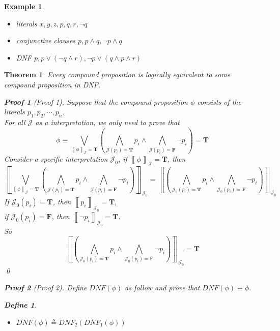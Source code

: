 \documentclass{ctexart}
\newcommand{\。}{．} %
\newcommand{\lb}{\left\llbracket}
\newcommand{\rb}{\right\rrbracket}
\newenvironment{huangse}{
    \begin{tcolorbox}[enhanced, breakable, colback=qhuang, boxrule=0pt, frame hidden,
        borderline west={0.7mm}{0.1mm}{shuang}]
    }
    {\end{tcolorbox}}
\newenvironment{zise}{
    \begin{tcolorbox}[enhanced, breakable, colback=qzi, boxrule=0pt, frame hidden,
        borderline west={0.7mm}{0.1mm}{szi}]
    }
    {\end{tcolorbox}}
\theoremstyle{t} %
\newtheorem{dyhj}{\color{slv} Define}[subsection] %
\newtheorem{dlhj}{\color{shuang} Theorem}[subsection]
\newtheorem{lthj}{\color{szi} Example}[subsection]
\newtheorem*{zmhj}{\color{slan} Proof}
\newenvironment{dl}{\begin{huangse}\begin{dlhj}}{\end{dlhj}\end{huangse}}
\newenvironment{lt}{\begin{zise}\begin{lthj}}{\end{lthj}\end{zise}}
\begin{document}
\begin{lt} \quad
    \begin{itemize}
        \item literals $x, y, z, p, q, r, \lnot q$
        \item conjunctive clauses $p, p \land q, \lnot p \land q$
        \item DNF $p, p \lor (\lnot q \land r), \lnot p \lor (q \land p \land r)$
    \end{itemize}
\end{lt}

\begin{dl}
    Every compound proposition is logically equivalent to some compound proposition in DNF.
    \begin{zmhj}[Proof 1]
        Suppose that the compound proposition $\phi$ consists of the literals $p_1, p_2, \cdots, p_n$. \\
        For all $\mathcal{J}$ as a interpretation, we only need to prove that 
        \[
            \phi \equiv \bigvee_{\lb \phi \rb_\mathcal{J} = \mathbf{T}}\left(\bigwedge_{\mathcal{J}(p_i) = \mathbf{T}}p_i \land \bigwedge_{\mathcal{J}(p_i) = \mathbf{F}}\lnot p_i \right) = \mathbf{T}
        \]
        Consider a specific interpretation $\mathcal{J}_0$, if $\lb \phi\rb_\mathcal{J} = \mathbf{T}$, then
        \[
            \left\llbracket \bigvee_{\lb \phi \rb_\mathcal{J} = \mathbf{T}}\left(\bigwedge_{\mathcal{J}(p_i) = \mathbf{T}}p_i \land \bigwedge_{\mathcal{J}(p_i) = \mathbf{F}}\lnot p_i \right) \right\rrbracket_{\mathcal{J}_0} 
             = \lb \left(\bigwedge_{\mathcal{J}_0(p_i) = \mathbf{T}}p_i \land \bigwedge_{\mathcal{J}_0(p_i) = \mathbf{F}}\lnot p_i\right)\rb_{\mathcal{J}_0} 
        \]
        If $\mathcal{J}_0(p_i) = \mathbf{T}$, then $\lb p_i \rb_{\mathcal{J_0}} = \mathbf{T}$, \\
        if $\mathcal{J}_0(p_i) = \mathbf{F}$, then $\lb \lnot p_i \rb_{\mathcal{J_0}} = \mathbf{T}$. \\
        So
        \[
            \lb \left(\bigwedge_{\mathcal{J}_0(p_i) = \mathbf{T}}p_i \land \bigwedge_{\mathcal{J}_0(p_i) = \mathbf{F}}\lnot p_i\right)\rb_{\mathcal{J}_0} = \mathbf{T}
        \]
        \qed
    \end{zmhj}
    \begin{zmhj}[Proof 2]
        Define $DNF(\phi)$ as follow and prove that $DNF(\phi) \equiv \phi$. 
        \begin{dyhj}
            \begin{itemize}
                \item $DNF(\phi) \triangleq DNF_2(DNF_1(\phi))$

\end{itemize}
\end{dyhj}
\end{zmhj}
\end{dl}
\end{document}
